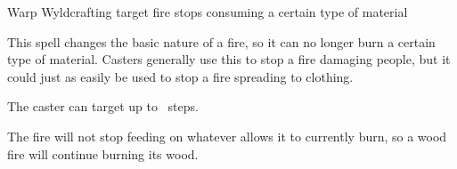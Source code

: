 
  {\mFire}%
  {Warp}%
  {\duplicated}%
  {Wyldcrafting}%
  {target fire stops consuming a certain type of material}%
  {
    This spell changes the basic nature of a fire, so it can no longer burn a certain type of material.
    Casters generally use this to stop a fire damaging people, but it could just as easily be used to stop a fire spreading to clothing.

    The caster can target up to \spellArea\ steps.

    The fire will not stop feeding on whatever allows it to currently burn, so a wood fire will continue burning its wood.
  }
